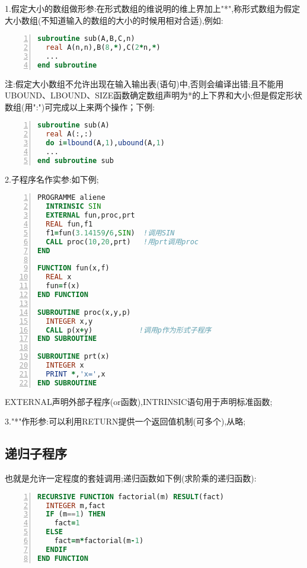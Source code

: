 1.假定大小的数组做形参:在形式数组的维说明的维上界加上"*",称形式数组为假定大小数组(不知道输入的数组的大小的时候用相对合适),例如:

\begin{lstlisting}[numbers=left,frame=single,language=Fortran]
subroutine sub(A,B,C,n)
  real A(n,n),B(8,*),C(2*n,*)
  ...
end subroutine
\end{lstlisting}
\par

注:假定大小数组不允许出现在输入输出表(语句)中,否则会编译出错;且不能用UBOUND、LBOUND、SIZE函数确定数组声明为*的上下界和大小;但是假定形状数组(用":")可完成以上来两个操作；下例:

\begin{lstlisting}[numbers=left,frame=single,language=Fortran]
subroutine sub(A)
  real A(:,:)
  do i=lbound(A,1),ubound(A,1)
  ...
end subroutine sub
\end{lstlisting}
\par

2.子程序名作实参:如下例;

\begin{lstlisting}[numbers=left,frame=single,language=Fortran]
PROGRAMME aliene
  INTRINSIC SIN
  EXTERNAL fun,proc,prt
  REAL fun,f1
  f1=fun(3.14159/6,SIN)  !调用SIN
  CALL proc(10,20,prt)   !用prt调用proc
END

FUNCTION fun(x,f)
  REAL x
  fun=f(x)
END FUNCTION

SUBROUTINE proc(x,y,p)
  INTEGER x,y
  CALL p(x+y)           !调用p作为形式子程序
END SUBROUTINE

SUBROUTINE prt(x)
  INTEGER x
  PRINT *,'x=',x
END SUBROUTINE
\end{lstlisting}
\par

EXTERNAL声明外部子程序(or函数),INTRINSIC语句用于声明标准函数;

3."*"作形参:可以利用RETURN提供一个返回值机制(可多个),从略;


\subsection{递归子程序}
也就是允许一定程度的套娃调用;递归函数如下例(求阶乘的递归函数):
\begin{lstlisting}[numbers=left,frame=single,language=Fortran]
RECURSIVE FUNCTION factorial(m) RESULT(fact)
  INTEGER m,fact
  IF (m==1) THEN
    fact=1
  ELSE
    fact=m*factorial(m-1)
  ENDIF
END FUNCTION
\end{lstlisting}
\par

